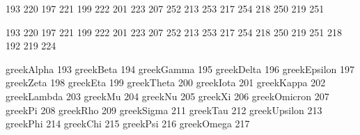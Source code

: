
 193 220  %
 197 221  %
 199 222  %
 201 223  %
 207 252  %
 213 253  %
 217 254  %
 218 250  %
 219 251  %


 193 220  %
 197 221  %
 199 222  %
 201 223  %
 207 252  %
 213 253  %
 217 254  %
 218 250  %
 219 251  %
 218 192  %
 219 224  %

\stopencoding

\startencoding[iso-8859-7]


 greekAlpha        193
 greekBeta         194
 greekGamma        195
 greekDelta        196
 greekEpsilon      197
 greekZeta         198
 greekEta          199
 greekTheta        200
 greekIota         201
 greekKappa        202
 greekLambda       203
 greekMu           204
 greekNu           205
 greekXi           206
 greekOmicron      207
 greekPi           208
 greekRho          209
 greekSigma        211
 greekTau          212
 greekUpsilon      213
 greekPhi          214
 greekChi          215
 greekPsi          216
 greekOmega        217


